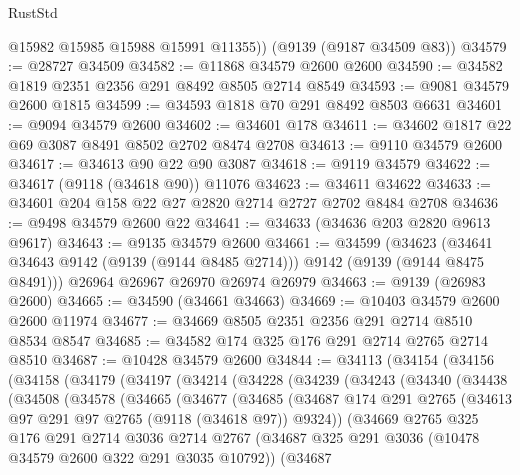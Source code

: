 \begin{lexlean}{RustStd}
\begin{coremodule}
        @15982
        @15985
        @15988
        @15991
        @11355))
    (@9139 (@9187 @34509 @83))
@34579 := @28727 @34509
@34582 := @11868 @34579 @2600 @2600
@34590 := @34582 @1819 @2351 @2356 @291 @8492 @8505 @2714 @8549
@34593 := @9081 @34579 @2600 @1815
@34599 := @34593 @1818 @70 @291 @8492 @8503 @6631
@34601 := @9094 @34579 @2600
@34602 := @34601 @178
@34611 := @34602 @1817 @22 @69 @3087 @8491 @8502 @2702 @8474 @2708
@34613 := @9110 @34579 @2600
@34617 := @34613 @90 @22 @90 @3087
@34618 := @9119 @34579
@34622 := @34617 (@9118 (@34618 @90)) @11076
@34623 := @34611 @34622
@34633 := @34601 @204 @158 @22 @27 @2820 @2714 @2727 @2702 @8484 @2708
@34636 := @9498 @34579 @2600 @22
@34641 := @34633 (@34636 @203 @2820 @9613 @9617)
@34643 := @9135 @34579 @2600
@34661 := @34599
    (@34623 (@34641 @34643 @9142 (@9139 (@9144 @8485 @2714))) @9142 (@9139 (@9144 @8475 @8491)))
    @26964
    @26967
    @26970
    @26974
    @26979
@34663 := @9139 (@26983 @2600)
@34665 := @34590 (@34661 @34663)
@34669 := @10403 @34579 @2600 @2600 @11974
@34677 := @34669 @8505 @2351 @2356 @291 @2714 @8510 @8534 @8547
@34685 := @34582 @174 @325 @176 @291 @2714 @2765 @2714 @8510
@34687 := @10428 @34579 @2600
@34844 := @34113
    (@34154
      (@34156
        (@34158
          (@34179
            (@34197
              (@34214
                (@34228
                  (@34239
                    (@34243
                      (@34340
                        (@34438
                          (@34508
                            (@34578
                              (@34665
                                (@34677
                                  (@34685
                                    (@34687
                                      @174
                                      @291
                                      @2765
                                      (@34613 @97 @291 @97 @2765 (@9118 (@34618 @97)) @9324))
                                    (@34669
                                      @2765
                                      @325
                                      @176
                                      @291
                                      @2714
                                      @3036
                                      @2714
                                      @2767
                                      (@34687
                                        @325
                                        @291
                                        @3036
                                        (@10478 @34579 @2600 @322 @291 @3035 @10792))
                                      (@34687

\end{coremodule}
\end{lexlean}
